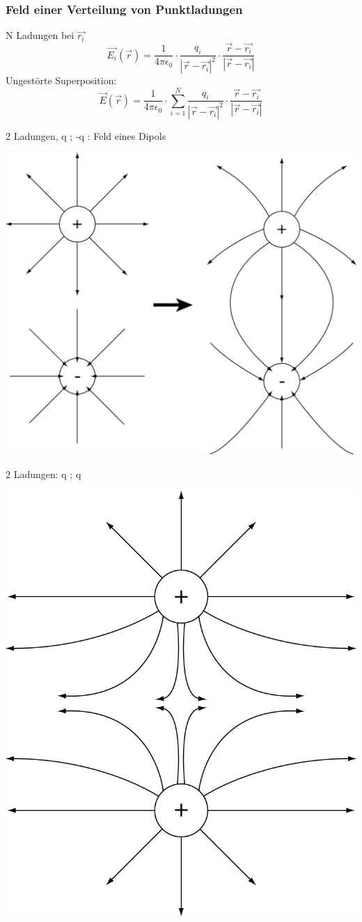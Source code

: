\documentclass[11pt]{article}
\begin{document}
	\subsubsection{Feld einer Verteilung von Punktladungen}
	N Ladungen bei $ \vec{r_i} $ 
	$$ \vec{E_i}(\vec{r}) = \frac{1}{4\pi\epsilon_0} \cdot \frac{q_i}{ | \vec{r} - \vec{r_i} |^2 } \cdot \frac{ \vec{r} - \vec{r_i}  }{ | \vec{r} - \vec{r_i}| }  $$
	Ungestörte Superposition:
	$$  \vec{E}(\vec{r}) = \frac{1}{4\pi\epsilon_0} \cdot {\displaystyle \sum_{i=1}^{N} \frac{q_i}{ | \vec{r} - \vec{r_i} |^2 } } \cdot \frac{ \vec{r} - \vec{r_i}  }{ | \vec{r} - \vec{r_i}| } $$
	\begin{minipage}{\textwidth}
		
		2 Ladungen, q ; -q : Feld eines Dipols 
		\begin{center}
			\includegraphics[width=0.4\linewidth]{skizzen/14/14_4B1}
		\end{center}
	
		2 Ladungen: q ; q 
		\begin{center}
			\includegraphics[width=0.4\linewidth]{skizzen/14/14_4B2}
		\end{center}
	
	\end{minipage}
	
\end{document}
